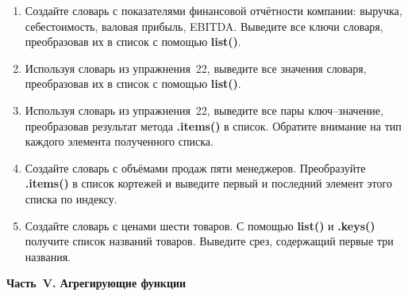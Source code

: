 \documentclass[a4,12pt]{article}
\theoremstyle{remark}
\begin{document}
\begin{enumerate}[resume]

    \item Создайте словарь с показателями финансовой отчётности компании: выручка, себестоимость, валовая прибыль, EBITDA. Выведите все ключи словаря, преобразовав их в список с помощью \textbf{list()}.

    \item Используя словарь из упражнения~22, выведите все значения словаря, преобразовав их в список с помощью \textbf{list()}.

    \item Используя словарь из упражнения~22, выведите все пары ключ--значение, преобразовав результат метода \textbf{.items()} в список. Обратите внимание на тип каждого элемента полученного списка.

    \item Создайте словарь с объёмами продаж пяти менеджеров. Преобразуйте \textbf{.items()} в список кортежей и выведите первый и последний элемент этого списка по индексу.

    \item Создайте словарь с ценами шести товаров. С помощью \textbf{list()} и \textbf{.keys()} получите список названий товаров. Выведите срез, содержащий первые три названия.

\end{enumerate}

\bigskip
\noindent\textbf{Часть~V. Агрегирующие функции}
\end{document}
